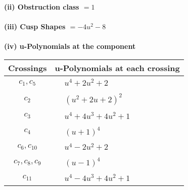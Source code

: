 \documentclass[1p]{elsarticle_modified}
\theoremstyle{definition}
\begin{document}
\flushleft \textbf{(ii) Obstruction class $= 1$}\\~\\
\flushleft \textbf{(iii) Cusp Shapes $= -4 u^2-8$}\\~\\
\newpage\renewcommand{\arraystretch}{1}
\flushleft \textbf{(iv) u-Polynomials at the component}\newline \\
\begin{tabular}{m{50pt}|m{274pt}}
Crossings & \hspace{64pt}u-Polynomials at each crossing \\
\hline $$\begin{aligned}c_{1},c_{5}\end{aligned}$$&$\begin{aligned}
&u^4+2 u^2+2
\end{aligned}$\\
\hline $$\begin{aligned}c_{2}\end{aligned}$$&$\begin{aligned}
&(u^2+2 u+2)^2
\end{aligned}$\\
\hline $$\begin{aligned}c_{3}\end{aligned}$$&$\begin{aligned}
&u^4+4 u^3+4 u^2+1
\end{aligned}$\\
\hline $$\begin{aligned}c_{4}\end{aligned}$$&$\begin{aligned}
&(u+1)^4
\end{aligned}$\\
\hline $$\begin{aligned}c_{6},c_{10}\end{aligned}$$&$\begin{aligned}
&u^4-2 u^2+2
\end{aligned}$\\
\hline $$\begin{aligned}c_{7},c_{8},c_{9}\end{aligned}$$&$\begin{aligned}
&(u-1)^4
\end{aligned}$\\
\hline $$\begin{aligned}c_{11}\end{aligned}$$&$\begin{aligned}
&u^4-4 u^3+4 u^2+1
\end{aligned}$\\
\hline
\end{tabular}\\~\\
\end{document}
